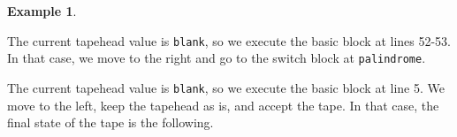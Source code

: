\documentclass{amsart}
\theoremstyle{definition}
\newtheorem{example}[rules]{Example}
\begin{document}
\begin{example}
\begin{figure}[H]
    \end{figure}
    \noindent The current tapehead value is \texttt{blank}, so we execute the basic block at lines 52-53. In that case, we move to the right and go to the switch block at \texttt{palindrome}.
    \begin{figure}[H]
        \centering
    \end{figure}
    \noindent The current tapehead value is \texttt{blank}, so we execute the basic block at line 5. We move to the left, keep the tapehead as is, and accept the tape. In that case, the final state of the tape is the following.
    \begin{figure}[H]
        \centering
    \end{figure}
\end{example}
\end{document}
